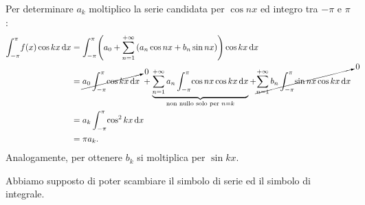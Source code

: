 \documentclass[../../analisi2]{subfiles}
\begin{document}
\begin{teorema}
            Per determinare \(a_k\) moltiplico la serie candidata per \(\cos nx\) ed integro tra \(-\pi\) e \(\pi\):
            \begin{align*}
                \int_{-\pi}^{\pi} \! f(x) \cos kx \, \mathrm{d}x &= \int_{-\pi}^{\pi} \! \left(a_0 + \sum_{n = 1}^{+\infty} \left(a_n \cos nx + b_n \sin nx\right)\right) \cos kx \, \mathrm{d}x\\
                &= \cancelto{0}{a_0 \int_{-\pi}^{\pi} \! \cos kx \, \mathrm{d}x} \; + \underbrace{\sum_{n = 1}^{+\infty} a_n \int_{-\pi}^{\pi} \! \cos nx \cos kx \, \mathrm{d}x}_{\text{non nullo solo per } n = k} + \cancelto{0}{\sum_{n = 1}^{+\infty} b_n \int_{-\pi}^{\pi} \! \sin nx \cos kx \, \mathrm{d}x}\\
                &= a_k \int_{-\pi}^{\pi} \! \cos^2 kx \, \mathrm{d}x\\
                &= \pi a_k.
            \end{align*}
            Analogamente, per ottenere \(b_k\) si moltiplica per \(\sin kx\).
        \end{teorema}
        \begin{osservazione}
            Abbiamo supposto di poter scambiare il simbolo di serie ed il simbolo di integrale.
        \end{osservazione}
\end{document}
